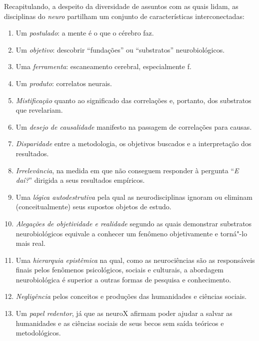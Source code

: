 Recapitulando, a despeito da diversidade de assuntos com as quais lidam,
as disciplinas do \emph{neuro} partilham um conjunto de características
interconectadas:

\begin{enumerate}
\item Um \emph{postulado}: a mente é o que o cérebro faz.

\item Um \emph{objetivo}: descobrir ``fundações'' ou ``substratos''
neurobiológicos.

\item Uma \emph{ferramenta}: escaneamento cerebral, especialmente f.

\item Um \emph{produto}: correlatos neurais.

\item \emph{Mistificação} quanto ao significado das correlações e,
portanto, dos substratos que revelariam.

\item Um \emph{desejo de causalidade} manifesto na passagem de
correlações para causas.

\item \emph{Disparidade} entre a metodologia, os objetivos buscados e a
interpretação dos resultados.

\item \emph{Irrelevância}, na medida em que não conseguem responder à
pergunta ``\emph{E daí?}'' dirigida a seus resultados empíricos.

\item Uma \emph{lógica autodestrutiva} pela qual as neurodisciplinas
ignoram ou eliminam (conceitualmente) seus supostos objetos de estudo.

\item \emph{Alegações de objetividade e realidade} segundo as quais
demonstrar substratos neurobiológicos equivale a conhecer um fenômeno
objetivamente e torná"-lo mais real.

\item Uma \emph{hierarquia epistêmica} na qual, como as neurociências
são as responsáveis finais pelos fenômenos psicológicos, sociais e
culturais, a abordagem neurobiológica é superior a outras formas de
pesquisa e conhecimento.

\item \emph{Negligência} pelos conceitos e produções das humanidades e
ciências sociais.

\item Um \emph{papel redentor}, já que as neuroX afirmam poder ajudar a salvar
as humanidades e as ciências sociais de seus becos sem saída teóricos e
metodológicos.
\end{enumerate}

